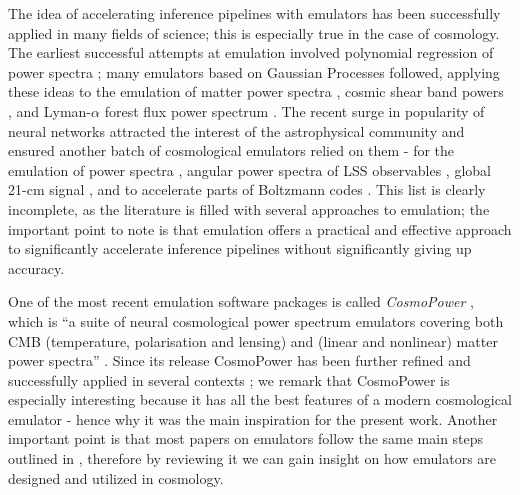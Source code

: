 The idea of accelerating inference pipelines with emulators has been successfully applied in many fields of science; this is especially true in the case of cosmology. The earliest successful attempts at emulation involved polynomial regression of power spectra \cite{emulator_poly_1} \cite{emulator_poly_2}; many emulators based on Gaussian Processes followed, applying these ideas to the emulation of matter power spectra \cite{emulator_gp_matter_1} \cite{emulator_gp_matter_2} \cite{emulator_gp_matter_3} \cite{emulator_gp_matter_4} \cite{emulator_gp_matter_5} \cite{emulator_gp_matter_6} \cite{emulator_gp_matter_7} \cite{emulator_gp_matter_8} \cite{emulator_gp_matter_9} \cite{emulator_gp_matter_10}, cosmic shear band powers \cite{emulator_gp_cosmic_shear_band_powers}, and Lyman-$\alpha$ forest flux power spectrum \cite{emulator_gp_lyman_1} \cite{emulator_gp_lyman_2}.
The recent surge in popularity of neural networks attracted the interest of the astrophysical community and ensured another batch of cosmological emulators relied on them - for the emulation of power spectra \cite{emulator_nn_matter_1} \cite{emulator_nn_matter_2} \cite{emulator_nn_matter_3} \cite{emulator_nn_matter_4} \cite{emulator_nn_matter_5} \cite{emulator_nn_matter_6}, angular power spectra of LSS observables \cite{emulator_nn_angular_lss}, global 21-cm signal \cite{emulator_nn_21_cm_1} \cite{emulator_nn_21_cm_2} \cite{emulator_nn_21_cm_3}, and to accelerate parts of Boltzmann codes \cite{emulator_nn_boltzmann}.
This list is clearly incomplete, as the literature is filled with several approaches to emulation; the important point to note is that emulation offers a practical and effective approach to significantly accelerate inference pipelines without significantly giving up accuracy.

One of the most recent emulation software packages is called \emph{CosmoPower} \cite{cosmopower}, which is ``a suite of neural cosmological power spectrum emulators covering both CMB (temperature, polarisation and lensing) and (linear and nonlinear) matter power spectra'' \cite{cosmopower}. Since its release CosmoPower has been further refined \cite{cosmopower_jax} and successfully applied in several contexts \cite{cosmopower} \cite{cosmopower_extra}; we remark that CosmoPower is especially interesting because it has all the best features of a modern cosmological emulator - hence why it was the main inspiration for the present work. Another important point is that most papers on emulators follow the same main steps outlined in \cite{cosmopower}, therefore by reviewing it we can gain insight on how emulators are designed and utilized in cosmology.

